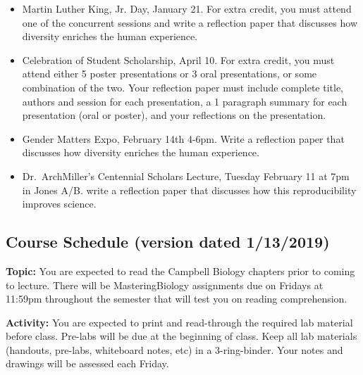 \documentclass{tufte-handout}
\begin{document}
\begin{fullwidth}
\begin{itemize}
\item Martin Luther King, Jr. Day, January 21. For extra credit, you must attend one of the concurrent sessions and write a reflection paper that discusses how diversity enriches the human experience. 
\item Celebration of Student Scholarship, April 10.  For extra credit, you must attend either 5 poster presentations or 3 oral presentations, or some combination of the two.  Your reflection paper must include complete title, authors and session for each presentation, a 1 paragraph summary for each presentation (oral or poster), and your reflections on the presentation.  	
\item Gender Matters Expo, February 14th 4-6pm. Write a reflection paper that discusses how diversity enriches the human experience.
\item Dr.\ ArchMiller's Centennial Scholars Lecture, Tuesday February 11 at 7pm in Jones A/B. write a reflection paper that discusses how this reproducibility improves science.
\end{itemize}









\newpage
\subsection{Course Schedule (version dated 1/13/2019)}
%

\textbf{Topic:} You are expected to read the Campbell Biology chapters prior to coming to lecture.  There will be MasteringBiology assignments due on Fridays at 11:59pm throughout the semester that will test you on reading comprehension. 

\textbf{Activity:} You are expected to print and read-through the required lab material before class. Pre-labs will be due at the beginning of class. Keep all lab materials (handouts, pre-labs, whiteboard notes, etc) in a 3-ring-binder. Your notes and drawings will be assessed each Friday.


\end{fullwidth}
\end{document}
